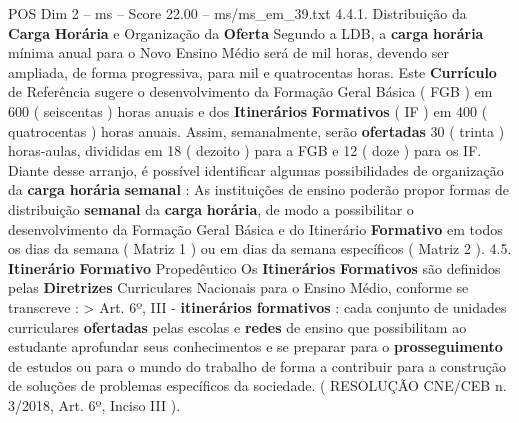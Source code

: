 \begin{textsample}{POS Dim 2 – ms – Score 22.00 – ms/ms\_em\_39.txt}  \label{ex:f2_pos_045}
4.4.1.
Distribuição da \textbf{Carga} \textbf{Horária} e Organização da \textbf{Oferta} Segundo a LDB, a \textbf{carga} \textbf{horária} mínima anual para o Novo Ensino Médio será de mil horas, devendo ser ampliada, de forma progressiva, para mil e quatrocentas horas.
Este \textbf{Currículo} de Referência sugere o desenvolvimento da Formação Geral Básica ( FGB ) em 600 ( seiscentas ) horas anuais e dos \textbf{Itinerários} \textbf{Formativos} ( IF ) em 400 ( quatrocentas ) horas anuais.
Assim, semanalmente, serão \textbf{ofertadas} 30 ( trinta ) horas-aulas, divididas em 18 ( dezoito ) para a FGB e 12 ( doze ) para os IF.
Diante desse arranjo, é possível identificar algumas possibilidades de organização da \textbf{carga} \textbf{horária} \textbf{semanal} : As instituições de ensino poderão propor formas de distribuição \textbf{semanal} da \textbf{carga} \textbf{horária}, de modo a possibilitar o desenvolvimento da Formação Geral Básica e do Itinerário \textbf{Formativo} em todos os dias da semana ( Matriz 1 ) ou em dias da semana específicos ( Matriz 2 ). 4.5. \textbf{Itinerário} \textbf{Formativo} Propedêutico Os \textbf{Itinerários} \textbf{Formativos} são definidos pelas \textbf{Diretrizes} Curriculares Nacionais para o Ensino Médio, conforme se transcreve : > Art. 6º, III - \textbf{itinerários} \textbf{formativos} : cada conjunto de unidades curriculares \textbf{ofertadas} pelas escolas e \textbf{redes} de ensino que possibilitam ao estudante aprofundar seus conhecimentos e se preparar para o \textbf{prosseguimento} de estudos ou para o mundo do trabalho de forma a contribuir para a construção de soluções de problemas específicos da sociedade. ( RESOLUÇÃO CNE/CEB n. 3/2018, Art. 6º, Inciso III ).

\end{textsample}
